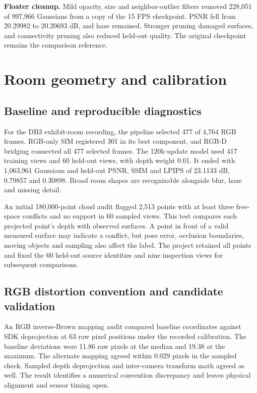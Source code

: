 \documentclass[11pt,a4paper]{article}
\begin{document}
\textbf{Floater cleanup.} Mild opacity, size and neighbor-outlier filters
removed 228,051 of 997,966 Gaussians from a copy of the 15 FPS checkpoint.
PSNR fell from 20.29982 to 20.20693 dB, and haze remained. Stronger pruning
damaged surfaces, and connectivity pruning also reduced held-out quality.
The original checkpoint remains the comparison reference.

\clearpage
\section{Room geometry and calibration}
\subsection{Baseline and reproducible diagnostics}
For the DB3 exhibit-room recording, the pipeline selected 477 of 4,764 RGB
frames. RGB-only SfM registered 301 in its best component, and RGB-D
bridging connected all 477 selected frames. The 120k-update model used
417 training views and 60 held-out views, with depth weight 0.01. It ended
with 1,063,961 Gaussians and held-out PSNR, SSIM and LPIPS of 23.1133 dB,
0.79857 and 0.30898. Broad room shapes are recognizable alongside blur,
haze and missing detail.

An initial 180,000-point cloud audit flagged 2,513 points with at least
three free-space conflicts and no support in 60 sampled views. This test
compares each projected point's depth with observed surfaces. A point in
front of a valid measured surface may indicate a conflict, but pose error,
occlusion boundaries, moving objects and sampling also affect the label.
The project retained all points and fixed the 60 held-out source identities
and nine inspection views for subsequent comparisons.

\subsection{RGB distortion convention and candidate validation}
An RGB inverse-Brown mapping audit compared baseline coordinates against
SDK deprojection at 63 raw pixel positions under the recorded calibration. The baseline
deviations were 11.86 raw pixels at the median and 19.38 at the maximum.
The alternate mapping agreed within 0.029 pixels in the sampled check.
Sampled depth deprojection and inter-camera transform math agreed as well.
The result identifies a numerical convention discrepancy and leaves
physical alignment and sensor timing open.
\end{document}
